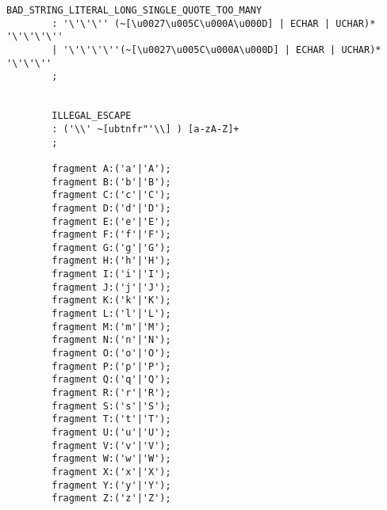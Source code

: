 \begin{lstlisting}[breaklines,basicstyle=\ttfamily]
		BAD_STRING_LITERAL_LONG_SINGLE_QUOTE_TOO_MANY
		: '\'\'\'' (~[\u0027\u005C\u000A\u000D] | ECHAR | UCHAR)*  '\'\'\'\''
		| '\'\'\'\''(~[\u0027\u005C\u000A\u000D] | ECHAR | UCHAR)*  '\'\'\''
		;
		
		
		ILLEGAL_ESCAPE
		: ('\\' ~[ubtnfr"'\\] ) [a-zA-Z]+ 
		;
		
		fragment A:('a'|'A');
		fragment B:('b'|'B');
		fragment C:('c'|'C');
		fragment D:('d'|'D');
		fragment E:('e'|'E');
		fragment F:('f'|'F');
		fragment G:('g'|'G');
		fragment H:('h'|'H');
		fragment I:('i'|'I');
		fragment J:('j'|'J');
		fragment K:('k'|'K');
		fragment L:('l'|'L');
		fragment M:('m'|'M');
		fragment N:('n'|'N');
		fragment O:('o'|'O');
		fragment P:('p'|'P');
		fragment Q:('q'|'Q');
		fragment R:('r'|'R');
		fragment S:('s'|'S');
		fragment T:('t'|'T');
		fragment U:('u'|'U');
		fragment V:('v'|'V');
		fragment W:('w'|'W');
		fragment X:('x'|'X');
		fragment Y:('y'|'Y');
		fragment Z:('z'|'Z');	


\end{lstlisting}


